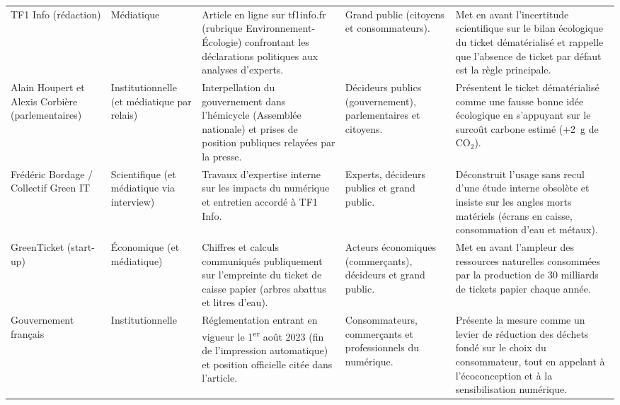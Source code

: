 \documentclass[10pt,a4paper]{article}
\newcommand{\med}{Médiatique}
\begin{document}
\begin{longtable}{@{}
  P{3.9cm} P{3.3cm} P{5.2cm} P{3.6cm} P{8.6cm} @{}}
TF1 Info (rédaction)
& \med
& Article en ligne sur tf1info.fr (rubrique Environnement-Écologie) confrontant les déclarations politiques aux analyses d'experts.
& Grand public (citoyens et consommateurs).
& Met en avant l'incertitude scientifique sur le bilan écologique du ticket dématérialisé et rappelle que l'absence de ticket par défaut est la règle principale. \\

Alain Houpert et Alexis Corbière (parlementaires)
& Institutionnelle (et médiatique par relais)
& Interpellation du gouvernement dans l'hémicycle (Assemblée nationale) et prises de position publiques relayées par la presse.
& Décideurs publics (gouvernement), parlementaires et citoyens.
& Présentent le ticket dématérialisé comme une fausse bonne idée écologique en s'appuyant sur le surcoût carbone estimé (+2~g de $\text{CO}_2$). \\

Frédéric Bordage / Collectif Green IT
& Scientifique (et médiatique via interview)
& Travaux d'expertise interne sur les impacts du numérique et entretien accordé à TF1 Info.
& Experts, décideurs publics et grand public.
& Déconstruit l'usage sans recul d'une étude interne obsolète et insiste sur les angles morts matériels (écrans en caisse, consommation d'eau et métaux). \\

GreenTicket (start-up)
& Économique (et médiatique)
& Chiffres et calculs communiqués publiquement sur l'empreinte du ticket de caisse papier (arbres abattus et litres d'eau).
& Acteurs économiques (commerçants), décideurs et grand public.
& Met en avant l'ampleur des ressources naturelles consommées par la production de 30 milliards de tickets papier chaque année. \\

Gouvernement français
& Institutionnelle
& Réglementation entrant en vigueur le 1\textsuperscript{er} août 2023 (fin de l'impression automatique) et position officielle citée dans l'article.
& Consommateurs, commerçants et professionnels du numérique.
& Présente la mesure comme un levier de réduction des déchets fondé sur le choix du consommateur, tout en appelant à l'écoconception et à la sensibilisation numérique. \\

\end{longtable}
\end{document}
